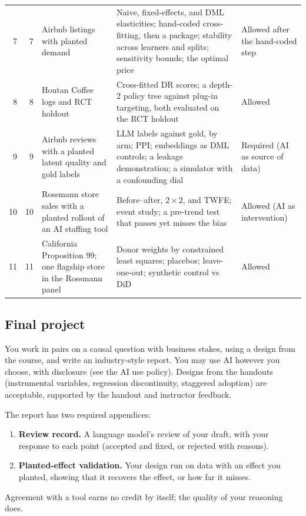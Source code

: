 \documentclass[11pt]{article}
\begin{document}
\begin{center}
\begin{tabular}{rrL{3.6cm}L{4.4cm}L{3.4cm}}
7 & 7 & Airbnb listings with planted demand & Naive, fixed-effects, and DML elasticities; hand-coded cross-fitting, then a package; stability across learners and splits; sensitivity bounds; the optimal price & Allowed after the hand-coded step \\
8 & 8 & Houtan Coffee logs and RCT holdout & Cross-fitted DR scores; a depth-2 policy tree against plug-in targeting, both evaluated on the RCT holdout & Allowed \\
9 & 9 & Airbnb reviews with a planted latent quality and gold labels & LLM labels against gold, by arm; PPI; embeddings as DML controls; a leakage demonstration; a simulator with a confounding dial & Required (AI as source of data) \\
10 & 10 & Rossmann store sales with a planted rollout of an AI staffing tool & Before--after, $2 \times 2$, and TWFE; event study; a pre-trend test that passes yet misses the bias & Allowed (AI as intervention) \\
11 & 11 & California Proposition 99; one flagship store in the Rossmann panel & Donor weights by constrained least squares; placebos; leave-one-out; synthetic control vs DiD & Allowed \\
\bottomrule
\end{tabular}
\end{center}

\subsection*{Final project}

You work in pairs on a causal question with business stakes, using a design from the course, and
write an industry-style report. You may use AI however you choose, with disclosure (see the AI use
policy). Designs from the handouts (instrumental variables, regression discontinuity, staggered
adoption) are acceptable, supported by the handout and instructor feedback.

The report has two required appendices:
\begin{enumerate}[label=(\alph*)]
    \item \textbf{Review record.} A language model's review of your draft, with your response to each
    point (accepted and fixed, or rejected with reasons).
    \item \textbf{Planted-effect validation.} Your design run on data with an effect you planted,
    showing that it recovers the effect, or how far it misses.
\end{enumerate}
Agreement with a tool earns no credit by itself; the quality of your reasoning does.
\end{document}
